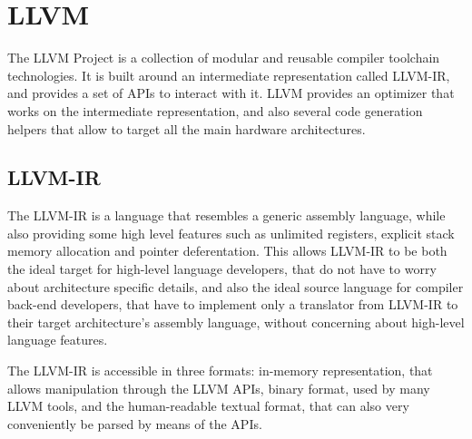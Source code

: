 
\section{LLVM}
The LLVM Project \cite{llvm} is a collection of modular and reusable compiler toolchain technologies. It is built around an intermediate representation called LLVM-IR, and provides a set of APIs to interact with it. LLVM provides an optimizer that works on the intermediate representation, and also several code generation helpers that allow to target all the main hardware architectures.
\subsection{LLVM-IR}
The LLVM-IR is a language that resembles a generic assembly language, while also providing some high level features such as unlimited registers, explicit stack memory allocation and pointer deferentation.
This allows LLVM-IR to be both the ideal target for high-level language developers, that do not have to worry about architecture specific details, and also the ideal source language for compiler back-end developers, that have to implement only a translator from LLVM-IR to their target architecture's assembly language, without concerning about high-level language features. \par
The LLVM-IR is accessible in three formats: in-memory representation, that allows manipulation through the LLVM APIs, binary format, used by many LLVM tools, and the human-readable textual format, that can also very conveniently be parsed by means of the APIs.


